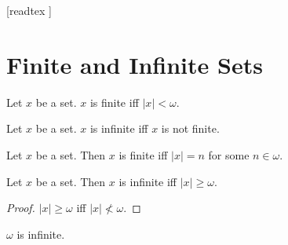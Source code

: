 \documentclass[10pt]{article}
\begin{document}
  \begin{imports}
    \begin{forthel}
      [readtex ]
    \end{forthel}
  \end{imports}


  \section*{Finite and Infinite Sets}

  \begin{forthel}
    \begin{definition}
      Let $x$ be a set.
      $x$ is finite iff $|x| < \omega$.
    \end{definition}
  \end{forthel}

  \begin{forthel}
    \begin{definition}
      Let $x$ be a set.
      $x$ is infinite iff $x$ is not finite.
    \end{definition}
  \end{forthel}

  \begin{forthel}
    \begin{proposition}
      Let $x$ be a set.
      Then $x$ is finite iff $|x| = n$ for some $n \in \omega$.
    \end{proposition}
  \end{forthel}

  \begin{forthel}
    \begin{proposition}
      Let $x$ be a set.
      Then $x$ is infinite iff $|x| \geq \omega$.
    \end{proposition}
    \begin{proof}
      $|x| \geq \omega$ iff $|x| \nless \omega$.
    \end{proof}
  \end{forthel}

  \begin{forthel}
    \begin{proposition}
      $\omega$ is infinite.
    \end{proposition}
  \end{forthel}
\end{document}

